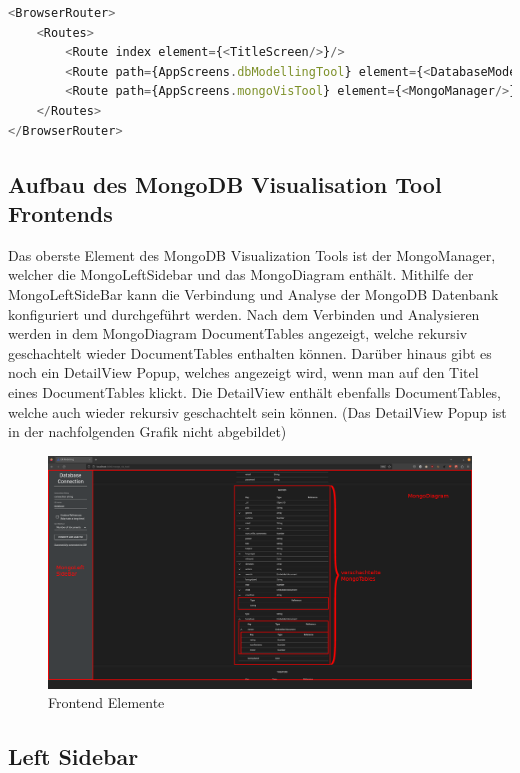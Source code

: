\begin{lstlisting}[language=JavaScript, caption={React Router in App.js},label={lst:app.js}]
<BrowserRouter>
    <Routes>
        <Route index element={<TitleScreen/>}/>
        <Route path={AppScreens.dbModellingTool} element={<DatabaseModellingTool/>}/>
        <Route path={AppScreens.mongoVisTool} element={<MongoManager/>}/>
    </Routes>
</BrowserRouter>
\end{lstlisting}

\subsection{Aufbau des MongoDB Visualisation Tool Frontends}
\label{sub:fe_aufbau}
Das oberste Element des MongoDB Visualization Tools ist der MongoManager, welcher die MongoLeftSidebar und das MongoDiagram enthält.
Mithilfe der MongoLeftSideBar kann die Verbindung und Analyse der MongoDB Datenbank konfiguriert und durchgeführt werden.
Nach dem Verbinden und Analysieren werden in dem MongoDiagram DocumentTables angezeigt, welche rekursiv geschachtelt wieder DocumentTables enthalten können.
Darüber hinaus gibt es noch ein DetailView Popup, welches angezeigt wird, wenn man auf den Titel eines DocumentTables klickt.
Die DetailView enthält ebenfalls DocumentTables, welche auch wieder rekursiv geschachtelt sein können.
(Das DetailView Popup ist in der nachfolgenden Grafik nicht abgebildet)

\begin{figure}[H]
    \includegraphics[width=\textwidth]{images/frontend_layers}
    \caption{Frontend Elemente}
    \label{fig:frontend_layers}
\end{figure}

\subsection{Left Sidebar}
\label{sub:fe_left_sidebar}


